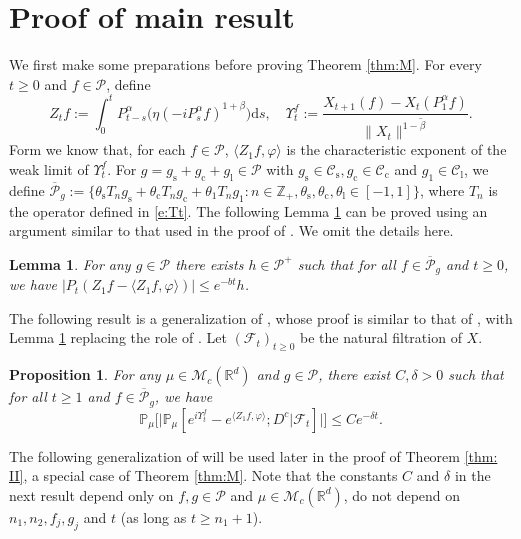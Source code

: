 \documentclass[12pt,a4paper]{amsart}
\theoremstyle{plain}
\newtheorem{lem}[thm]{Lemma}
\newtheorem{prop}[thm]{Proposition}
\theoremstyle{definition}
\numberwithin{equation}{section}
\begin{document}
\section{Proof of main result}
\label{proofs of main results}
	We first make some preparations before proving Theorem \ref{thm:M}.
	For every $t\geq 0$ and $f\in \mathcal P$, define
\[
  	Z_t f
  	:= \int_0^t P^\alpha_{t-s}\big( \eta (-i P^\alpha_sf)^{1+\beta}\big)\mathrm ds,
  	\quad \Upsilon^f_t
   	:= \frac{X_{t+1} (f) - X_t(P_1^\alpha f)}{\| X_t\|^{1-\tilde \beta}}.
\]
	Form \cite[Theorem 3.4]{RenSongSunZhao2019Stable} we know that, for each $f\in \mathcal P$, $\langle Z_1f,\varphi\rangle$ is the characteristic exponent of 
the weak limit of $\Upsilon^f_t$.
	For $g = g_\mathrm s + g_\mathrm c + g_\mathrm l\in \mathcal P$ with $g_\mathrm s \in \mathcal C_\mathrm s, g_\mathrm c \in \mathcal C_\mathrm c$ and $g_\mathrm 1 \in \mathcal C_\mathrm l$, we define $\overline {\mathcal P}_g:= \{\theta_\mathrm s T_n g_\mathrm s +  \theta_\mathrm c T_n g_\mathrm c + \theta_\mathrm 1 T_n g_\mathrm 1: n \in \mathbb Z_+, \theta_\mathrm s, \theta_\mathrm c, \theta_\mathrm l \in [-1,1]\}$, where $T_n$ is the operator defined in \eqref{e:Tt}.
	The following Lemma \ref{lem:P:R} can be proved using 
an argument similar to that used in the proof of 
	\cite[Lemma 2.9]{RenSongSunZhao2019Stable}. We omit the details here.
\begin{lem}
\label{lem:P:R}
	For any $g\in \mathcal P$ there exists $h \in \mathcal P^+$ such that for all $ f \in \overline {\mathcal P}_g$ and $t\geq 0$, we have $ | P_t (Z_1 f - \langle Z_1 f, \varphi \rangle )| \leq e^{-bt} h$.
\end{lem}

	The following result is a generalization of \cite[Proposition 3.5]{RenSongSunZhao2019Stable}, whose proof is similar to that of \cite[Proposition 3.5]{RenSongSunZhao2019Stable},
with Lemma \ref{lem:P:R} replacing the role of \cite[Lemma 2.9]{RenSongSunZhao2019Stable}.
	Let $(\mathscr F_t)_{t\geq 0}$ be the natural filtration of $X$.
	\begin{prop}
\label{thm:Key}
	For any $\mu \in \mathcal M_c(\mathbb R^d)$  and $g \in \mathcal P$, there exist $C,\delta>0$ such that for all $t\geq 1$ and $f \in \overline{\mathcal P}_g$, we have
\[
	\mathbb P_\mu
	\Big[ \big|\mathbb P_\mu [e^{i\Upsilon^f_t} - e^{\langle Z_1f, \varphi\rangle}; D^c | \mathscr F_t ]  \big|\Big]
	\leq C e^{- \delta t}.
\]
\end{prop}

	The following generalization of \cite[Proposition 3.5]{RenSongSunZhao2019Stable} will be used later in the proof of  Theorem \ref{thm: II}, a special case of Theorem \ref{thm:M}.
	Note that the constants $C$ and $\delta$ in the next result depend only on $f,g\in \mathcal P$ and $\mu\in \mathcal M_c(\mathbb R^d)$, do not depend on $n_1, n_2, f_j, g_j$ and $t$ (as long as $t\geq n_1+1$).
\end{document}
